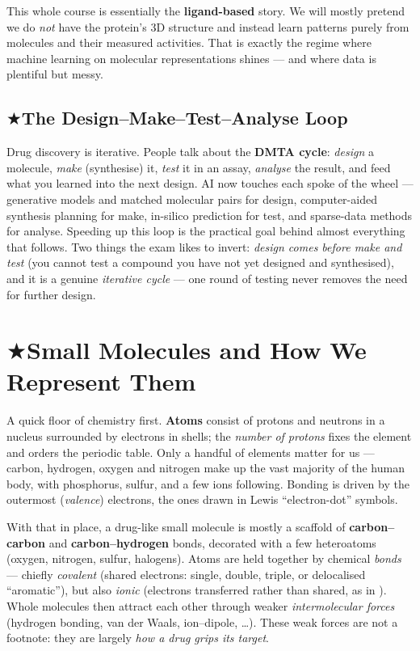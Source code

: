 \documentclass[11pt, oneside]{book}
\makeatletter
\newcommand{\starglyph}{\textcolor{stargold}{\ensuremath{\bigstar}}}
\newcommand{\starsec}[1]{%
  \texorpdfstring{\starglyph\hspace{0.4em}\textcolor{star@frame}{#1}}{#1}}
\makeatother
\begin{document}
\begin{intbox}
This whole course is essentially the \textbf{ligand-based} story. We will mostly
pretend we do \emph{not} have the protein's 3D structure and instead learn
patterns purely from molecules and their measured activities. That is exactly the
regime where machine learning on molecular representations shines --- and where
data is plentiful but messy.
\end{intbox}

\subsection{\starsec{The Design--Make--Test--Analyse Loop}}

Drug discovery is iterative. People talk about the \textbf{DMTA cycle}:
\emph{design} a molecule, \emph{make} (synthesise) it, \emph{test} it in an assay,
\emph{analyse} the result, and feed what you learned into the next design. AI now
touches each spoke of the wheel --- generative models and matched molecular pairs
for design, computer-aided synthesis planning for make, in-silico prediction for
test, and sparse-data methods for analyse. Speeding up this loop is the practical
goal behind almost everything that follows. Two things the exam likes to invert:
\emph{design comes before make and test} (you cannot test a compound you have not
yet designed and synthesised), and it is a genuine \emph{iterative cycle} --- one
round of testing never removes the need for further design.

\section{\starsec{Small Molecules and How We Represent Them}}
A quick floor of chemistry first. \textbf{Atoms} consist of protons and neutrons
in a nucleus surrounded by electrons in shells; the \emph{number of protons} fixes
the element and orders the periodic table. Only a handful of elements matter for us
--- carbon, hydrogen, oxygen and nitrogen make up the vast majority of the human
body, with phosphorus, sulfur, and a few ions following. Bonding is driven by the
outermost (\emph{valence}) electrons, the ones drawn in Lewis ``electron-dot''
symbols.

\medskip
With that in place, a drug-like small molecule is mostly a scaffold of
\textbf{carbon--carbon} and \textbf{carbon--hydrogen} bonds, decorated with a few
heteroatoms (oxygen, nitrogen, sulfur, halogens). Atoms are held together by
chemical \emph{bonds} --- chiefly \emph{covalent} (shared electrons: single,
double, triple, or delocalised ``aromatic''), but also \emph{ionic} (electrons
transferred rather than shared, as in ). Whole molecules then attract
each other through weaker \emph{intermolecular forces} (hydrogen bonding, van der
Waals, ion--dipole, \dots). These weak forces are not a footnote: they are
largely \emph{how a drug grips its target}.
\end{document}
